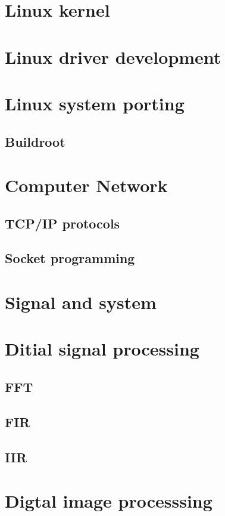 \documentclass[UTF8]{book}
\begin{document}
	\part{Linux kernel}
	
	\part{Linux driver development}
	
	\part{Linux system porting}
	\chapter{Buildroot}
	
	\part{Computer Network}
	\chapter{TCP/IP protocols}
	\chapter{Socket programming}
	
	
	\part{Signal and system}
	
	\part{Ditial signal processing}
	\chapter{FFT}
	\chapter{FIR}
	\chapter{IIR}
	
	\part{Digtal image processsing}
	
\end{document}

